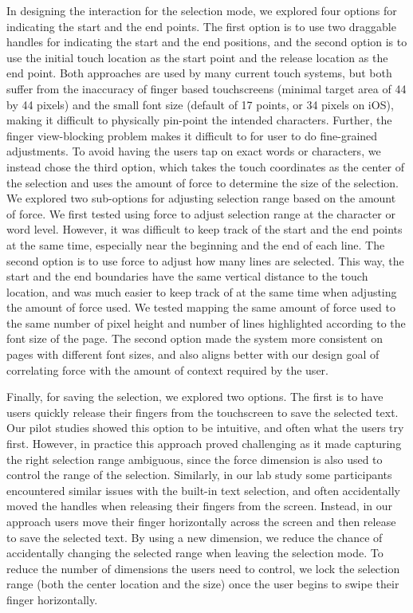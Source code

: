 In designing the interaction for the selection mode, we explored four options for indicating the start and the end points. The first option is to use two draggable handles for indicating the start and the end positions, and the second option is to use the initial touch location as the start point and the release location as the end point. Both approaches are used by many current touch systems, but both suffer from the inaccuracy of finger based touchscreens (minimal target area of 44 by 44 pixels) and the small font size (default of 17 points, or 34 pixels on iOS), making it difficult to physically pin-point the intended characters. Further, the finger view-blocking problem makes it difficult to for user to do fine-grained adjustments. To avoid having the users tap on exact words or characters, we instead chose the third option, which takes the touch coordinates as the center of the selection and uses the amount of force to determine the size of the selection. We explored two sub-options for adjusting selection range based on the amount of force. We first tested using force to adjust selection range at the character or word level. However, it was difficult to keep track of the start and the end points at the same time, especially near the beginning and the end of each line. The second option is to use force to adjust how many lines are selected. This way, the start and the end boundaries have the same vertical distance to the touch location, and was much easier to keep track of at the same time when adjusting the amount of force used. We tested mapping the same amount of force used to the same number of pixel height and number of lines highlighted according to the font size of the page. The second option made the system more consistent on pages with different font sizes, and also aligns better with our design goal of correlating force with the amount of context required by the user.

Finally, for saving the selection, we explored two options. The first is to have users quickly release their fingers from the touchscreen to save the selected text. Our pilot studies showed this option to be intuitive, and often what the users try first. However, in practice this approach proved challenging as it made capturing the right selection range ambiguous, since the force dimension is also used to control the range of the selection. Similarly, in our lab study some participants encountered similar issues with the built-in text selection, and often accidentally moved the handles when releasing their fingers from the screen. Instead, in our approach users move their finger horizontally across the screen and then release to save the selected text. By using a new dimension, we reduce the chance of accidentally changing the selected range when leaving the selection mode. To reduce the number of dimensions the users need to control, we lock the selection range (both the center location and the size) once the user begins to swipe their finger horizontally. 

